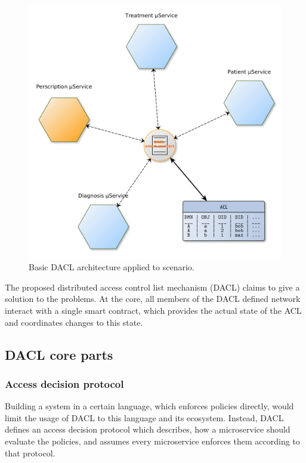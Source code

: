\documentclass[12pt, conference]{IEEEtran}
\begin{document}
\begin{figure}[!h]
    \centering
  \includegraphics[width=\linewidth]{figures/DACL-basic.png}
  \caption{Basic DACL architecture applied to scenario.}
  \label{fig:basic-dacl}
\end{figure}

The proposed distributed access control list mechanism (DACL) claims to give a solution to the problems. At the core, all members of the DACL defined network interact with a single smart contract, which provides the actual state of the ACL and coordinates changes to this state. 


\subsection{DACL core parts}


\subsubsection{Access decision protocol}
Building a system in a certain language, which enforces policies directly, would limit the usage of DACL to this language and its ecosystem. Instead, DACL defines an access decision protocol which describes, how a microservice should evaluate the policies, and assumes every microservice enforces them according to that protocol.
\end{document}
